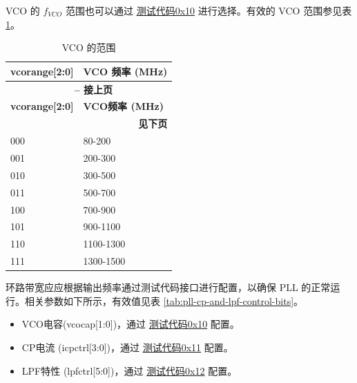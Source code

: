 \documentclass[main\_\_CN.tex]{subfiles}
\begin{document}
VCO 的 $f_{VCO}$ 范围也可以通过 \hyperref[sec:test-code-0x10]{测试代码0x10} 进行选择。有效的 VCO 范围参见表 \ref{tab:vco-ranges}。

\begin{longtable}{|p{3cm}|p{5cm}|}
    \caption{VCO 的范围} \label{tab:vco-ranges} \\
    \hline
    \rowcolor{lightgray}
    \textbf{vcorange[2:0]} & \textbf{VCO 频率 (MHz)} \\ \hline
    \endfirsthead

    \multicolumn{2}{c}{\bfseries \tablename\ \thetable{} -- 接上页}\\\hline
    \rowcolor{lightgray}
    \textbf{vcorange[2:0]} & \textbf{VCO频率 (MHz)} \\ \hline
    \endhead

    \multicolumn{2}{r}{\textbf{见下页}} \\
    \endfoot

    \endlastfoot
    
    000 & 80-200  \\ \hline
    001 & 200-300  \\ \hline
    010 & 300-500  \\ \hline
    011 & 500-700  \\ \hline
    100 & 700-900  \\ \hline
    101 & 900-1100  \\ \hline
    110 & 1100-1300  \\ \hline
    111 & 1300-1500  \\ \hline
\end{longtable}

环路带宽应应根据输出频率通过测试代码接口进行配置，以确保 PLL 的正常运行。相关参数如下所示，有效值见表 \ref{tab:pll-cp-and-lpf-control-bits}。

\begin{itemize}
    \item VCO电容(vcocap[1:0])，通过 \hyperref[sec:test-code-0x10]{测试代码0x10} 配置。
    \item CP电流 (icpctrl[3:0])，通过 \hyperref[sec:test-code-0x11]{测试代码0x11} 配置。
    \item LPF特性 (lpfctrl[5:0])，通过 \hyperref[sec:test-code-0x12]{测试代码0x12} 配置。
\end{itemize}
\end{document}
